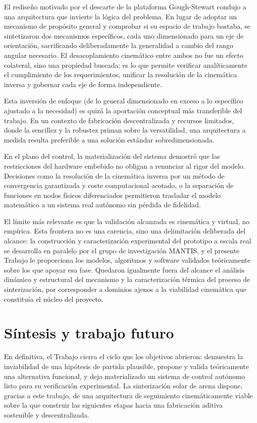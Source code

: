 El rediseño motivado por el descarte de la plataforma Gough-Stewart condujo a una arquitectura que invierte la lógica del problema. En lugar de adoptar un mecanismo de propósito general y comprobar si su espacio de trabajo bastaba, se sintetizaron dos mecanismos específicos, cada uno dimensionado para un eje de orientación, sacrificando deliberadamente la generalidad a cambio del rango angular necesario. El desacoplamiento cinemático entre ambos no fue un efecto colateral, sino una propiedad buscada: es lo que permite verificar analíticamente el cumplimiento de los requerimientos, unificar la resolución de la cinemática inversa y gobernar cada eje de forma independiente.

Esta inversión de enfoque (de lo general dimensionado en exceso a lo específico ajustado a la necesidad) es quizá la aportación conceptual más transferible del trabajo. En un contexto de fabricación descentralizada y recursos limitados, donde la sencillez y la robustez priman sobre la versatilidad, una arquitectura a medida resulta preferible a una solución estándar sobredimensionada.

En el plano del control, la materialización del sistema demostró que las restricciones del hardware embebido no obligan a renunciar al rigor del modelo. Decisiones como la resolución de la cinemática inversa por un método de convergencia garantizada y coste computacional acotado, o la separación de funciones en nodos físicos diferenciados permitieron trasladar el modelo matemático a un sistema real autónomo sin pérdida de fidelidad.

El límite más relevante es que la validación alcanzada es cinemática y virtual, no empírica. Esta frontera no es una carencia, sino una delimitación deliberada del alcance: la construcción y caracterización experimental del prototipo a escala real se desarrolla en paralelo por el grupo de investigación MANTIS, y el presente Trabajo le proporciona los modelos, algoritmos y software validados teóricamente sobre los que apoyar esa fase. Quedaron igualmente fuera del alcance el análisis dinámico y estructural del mecanismo y la caracterización térmica del proceso de sinterización, por corresponder a dominios ajenos a la viabilidad cinemática que constituía el núcleo del proyecto.

\section{Síntesis y trabajo futuro}

En definitiva, el Trabajo cierra el ciclo que los objetivos abrieron: demuestra la inviabilidad de una hipótesis de partida plausible, propone y valida teóricamente una alternativa funcional, y deja materializado un sistema de control autónomo listo para su verificación experimental. La sinterización solar de arena dispone, gracias a este trabajo, de una arquitectura de seguimiento cinemáticamente viable sobre la que construir las siguientes etapas hacia una fabricación aditiva sostenible y descentralizada.